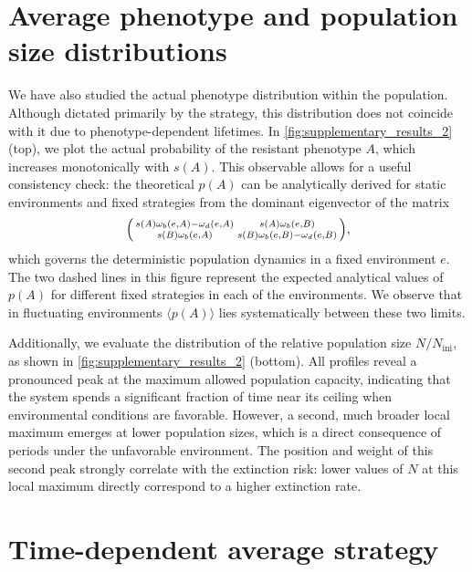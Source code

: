 \documentclass[aps,pre,reprint,10pt,superscriptaddress]{revtex4-2}
\begin{document}
\begin{appendices}
    \section{Average phenotype and population size distributions} \label{sec:other_distributions}

    We have also studied the actual phenotype distribution within the population. Although dictated primarily by the strategy, this distribution does not coincide with it due to phenotype-dependent lifetimes. In \cref{fig:supplementary_results_2} (top), we plot the actual probability of the resistant phenotype $A$, which increases monotonically with $s(A)$. This observable allows for a useful consistency check: the theoretical $p(A)$ can be analytically derived for static environments and fixed strategies from the dominant eigenvector of the matrix
    \begin{equation}
        \begin{psmallmatrix}
            s(A)\omega_b(e,A)-\omega_d(e,A) & s(A)\omega_b(e,B)               \\
            s(B)\omega_b(e,A)               & s(B)\omega_b(e,B)-\omega_d(e,B)
        \end{psmallmatrix},
    \end{equation}
    which governs the deterministic population dynamics in a fixed environment $e$. The two dashed lines in this figure represent the expected analytical values of $p(A)$ for different fixed strategies in each of the environments. We observe that in fluctuating environments $\langle p(A)\rangle$ lies systematically between these two limits.

    Additionally, we evaluate the distribution of the relative population size $N/N_\text{ini}$, as shown in \cref{fig:supplementary_results_2} (bottom). All profiles reveal a pronounced peak at the maximum allowed population capacity, indicating that the system spends a significant fraction of time near its ceiling when environmental conditions are favorable. However, a second, much broader local maximum emerges at lower population sizes, which is a direct consequence of periods under the unfavorable environment. The position and weight of this second peak strongly correlate with the extinction risk: lower values of $N$ at this local maximum directly correspond to a higher extinction rate.

    \section{Time-dependent average strategy} \label{sec:time_dependent_strategy}


\end{appendices}
\end{document}
